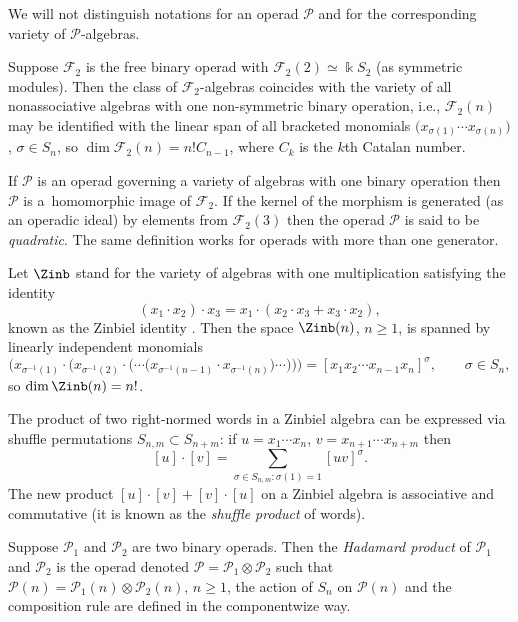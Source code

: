 We will not distinguish notations for an operad $\mathcal P$
and for the corresponding variety of $\mathcal P$-algebras.

\begin{Example}
Suppose $\mathcal F_2$ is the free binary operad with
$\mathcal F_2(2) \simeq \Bbbk S_2$ (as symmetric modules).
Then the class of $\mathcal F_2$-algebras
coincides with the variety of all nonassociative
algebras with one non-symmetric binary operation,
i.e., $\mathcal F_2(n)$ may be identified with the
linear span of all bracketed monomials
$\bigl(x_{\sigma(1)}\cdots x_{\sigma(n)}\bigr)$, $\sigma \in S_n$,
so $\dim \mathcal F_2(n) = n! C_{n-1}$, where $C_k$ is the $k$th
Catalan number.
\end{Example}

If $\mathcal P$ is an operad governing a variety
of algebras with one binary operation then
$\mathcal P$ is a~homomorphic image of $\mathcal F_2$.
If the kernel of the morphism is generated (as an operadic ideal) by elements from $\mathcal F_2(3)$ then
the operad $\mathcal P$ is said to be {\em quadratic}.
The same definition works for operads with more than one generator.

\begin{Example}\label{exmp:Zinbiel}
Let $\Zinb$ stand for the variety of algebras with one multiplication
satisfying the identity
%
\begin{equation}\label{eq:Zinbiel}
(x_1\cdot x_2)\cdot x_3
= x_1\cdot (x_2\cdot x_3 + x_3\cdot x_2),
\end{equation}
%
known as the Zinbiel identity \cite{Loday}.
Then the space $\Zinb(n)$, $n\ge 1$, is spanned by
linearly independent monomials
\[
\bigl( x_{\sigma^{-1}(1)}\cdot \bigl(x_{\sigma^{-1}(2)}\cdot \bigl(\cdots \bigl(x_{\sigma^{-1}(n-1)}\cdot x_{\sigma^{-1}(n)}\bigr)\cdots \bigr)\bigr) \bigr)
=
[x_{1}x_{2}\cdots x_{n-1}x_{n}]^\sigma ,
\qquad \sigma \in S_n,
\]
so $\dim \Zinb(n)=n!$.

The product of two right-normed words in a Zinbiel algebra
can be expressed via shuffle permutations $S_{n,m}\subset S_{n+m}$: if $u= x_1\cdots x_n$, $v = x_{n+1}\cdots x_{n+m}$
then
\[
[u]\cdot [v]
=\sum\limits_{\sigma\in S_{n,m}\colon \sigma (1)=1}
[uv]^\sigma .
\]
The new product $[u]\cdot [v] + [v]\cdot [u]$
on a Zinbiel algebra
is associative and commutative (it is known as the {\em shuffle product}
of words).
\end{Example}


Suppose $\mathcal P_1$ and $\mathcal P_2$ are two binary operads.
Then the {\em Hadamard product} of $\mathcal P_1$ and $\mathcal P_2$ is the operad denoted
$\mathcal P= \mathcal P_1\otimes \mathcal P_2$ such that
$\mathcal P(n)= \mathcal P_1(n)\otimes \mathcal P_2(n)$, $n\ge 1$,
the action of $S_n$ on $\mathcal P(n)$ and the composition rule are defined in
the componentwize way.

